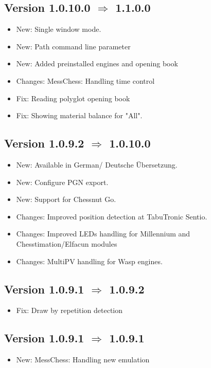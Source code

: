 \documentclass[11pt,a4paper]{article}
\begin{document}
\subsection*{Version 1.0.10.0 $\Rightarrow$  1.1.0.0}
\begin{itemize}			
	\item {\color{blue}New}: Single window mode.
	\item {\color{blue}New}: Path command line parameter
	\item {\color{blue}New}: Added preinstalled engines and opening book
	\item {\color{teal}Changes}: MessChess: Handling time control
	\item {\color{red}Fix}: Reading polyglot opening book
	\item {\color{red}Fix}: Showing material balance for "All".
\end{itemize}

\subsection*{Version 1.0.9.2 $\Rightarrow$  1.0.10.0}
\begin{itemize}			
		\item {\color{blue}New}: Available in German/ Deutsche Übersetzung.
		\item {\color{blue}New}: Configure PGN export.
		\item {\color{blue}New}: Support for Chessnut Go.
		\item {\color{teal}Changes}: Improved position detection at TabuTronic Sentio.
		\item {\color{teal}Changes}: Improved LEDs handling for Millennium and Chesstimation/Elfacun modules
		\item {\color{teal}Changes}: MultiPV handling for Wasp engines.
	
\end{itemize}


\subsection*{Version 1.0.9.1 $\Rightarrow$  1.0.9.2}
\begin{itemize}			
	\item {\color{red}Fix}: Draw by repetition detection
\end{itemize}


\subsection*{Version 1.0.9.1 $\Rightarrow$  1.0.9.1}
\begin{itemize}			
	\item {\color{blue}New}: MessChess: Handling new emulation
\end{itemize}
\end{document}
